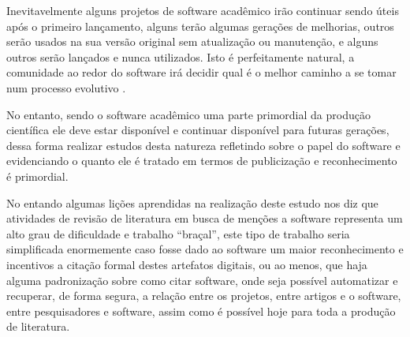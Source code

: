 %

Inevitavelmente alguns projetos de software acadêmico irão continuar sendo
úteis após o primeiro lançamento, alguns terão algumas gerações de melhorias,
outros serão usados na sua versão original sem atualização ou manutenção, e
alguns outros serão lançados e nunca utilizados. Isto é perfeitamente natural,
a comunidade ao redor do software irá decidir qual é o melhor caminho a se
tomar num processo evolutivo \cite{weiner2009astronomical}.

No entanto, sendo o software acadêmico uma parte primordial da produção
científica ele deve estar disponível e continuar disponível para futuras
gerações, dessa forma realizar estudos desta natureza refletindo sobre
o papel do software e evidenciando o quanto ele é tratado em termos
de publicização e reconhecimento é primordial.

No entando algumas lições aprendidas na realização deste estudo nos diz que
atividades de revisão de literatura em busca de menções a software representa
um alto grau de dificuldade e trabalho ``braçal'', este tipo de trabalho seria
simplificada enormemente caso fosse dado ao software um maior reconhecimento e
incentivos a citação formal destes artefatos digitais, ou ao menos, que haja
alguma padronização sobre como citar software, onde seja possível automatizar e
recuperar, de forma segura, a relação entre os projetos, entre artigos e o
software, entre pesquisadores e software, assim como é possível hoje para toda
a produção de literatura.



